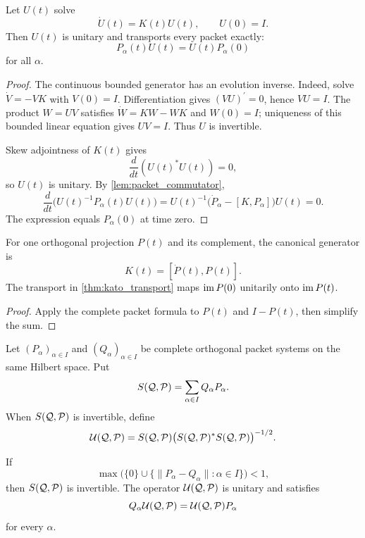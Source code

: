 \begin{theorem}\label{thm:kato_transport}
Let $U(t)$ solve
\[
\dot U(t)=K(t)U(t),
\qquad
U(0)=I.
\]
Then $U(t)$ is unitary and transports every packet exactly:
\[
P_\alpha(t)U(t)=U(t)P_\alpha(0)
\]
for all $\alpha$.
\end{theorem}

\begin{proof}
The continuous bounded generator has an evolution inverse. Indeed, solve $\dot V=-VK$ with $V(0)=I$. Differentiation gives $(VU)^{\prime}=0$, hence $VU=I$. The product $W=UV$ satisfies $\dot W=KW-WK$ and $W(0)=I$; uniqueness of this bounded linear equation gives $UV=I$. Thus $U$ is invertible.

Skew adjointness of $K(t)$ gives
\[
\frac{d}{dt}(U(t)^*U(t))=0,
\]
so $U(t)$ is unitary.  By \cref{lem:packet_commutator},
\[
\frac{d}{dt}\big(U(t)^{-1}P_\alpha(t)U(t)\big)
=
U(t)^{-1}\big(\dot P_\alpha-[K,P_\alpha]\big)U(t)
=0.
\]
The expression equals $P_\alpha(0)$ at time zero.
\end{proof}

\begin{corollary}\label{cor:one_moving_subspace}
For one orthogonal projection $P(t)$ and its complement, the canonical generator is
\[
K(t)=[\dot P(t),P(t)].
\]
The transport in \cref{thm:kato_transport} maps $\operatorname{im} P(0)$ unitarily onto $\operatorname{im} P(t)$.
\end{corollary}

\begin{proof}
Apply the complete packet formula to $P(t)$ and $I-P(t)$, then simplify the sum.
\end{proof}


\begin{definition}\label{def:packet_direct_rotation}
Let $(P_\alpha)_{\alpha\in I}$ and $(Q_\alpha)_{\alpha\in I}$ be complete orthogonal packet systems on the same Hilbert space.  Put
\[
S(\mathcal Q,\mathcal P)=\sum_{\alpha\in I}Q_\alpha P_\alpha.
\]
When $S(\mathcal Q,\mathcal P)$ is invertible, define
\[
\mathcal U(\mathcal Q,\mathcal P)
=
S(\mathcal Q,\mathcal P)
\big(S(\mathcal Q,\mathcal P)^*S(\mathcal Q,\mathcal P)\big)^{-1/2}.
\]
\end{definition}

\begin{proposition}\label{prop:packet_direct_rotation}
If
\[
\max\bigl(\{0\}\cup\{\|P_\alpha-Q_\alpha\|:\alpha\in I\}\bigr)<1,
\]
then $S(\mathcal Q,\mathcal P)$ is invertible.  The operator $\mathcal U(\mathcal Q,\mathcal P)$ is unitary and satisfies
\[
Q_\alpha\mathcal U(\mathcal Q,\mathcal P)
=
\mathcal U(\mathcal Q,\mathcal P)P_\alpha
\]
for every $\alpha$.
\end{proposition}

